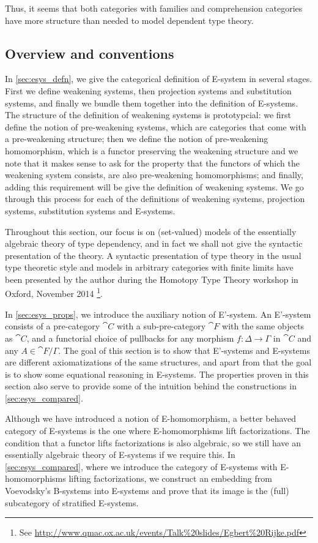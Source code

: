 \documentclass{article}
\begin{document}
Thus, it seems that both categories with families and comprehension categories
have more structure than needed to model dependent type theory.

\subsection*{Overview and conventions}
In \autoref{sec:esys_defn}, we give the categorical definition of E-system in 
several stages. First we define weakening systems, then projection systems and
substitution systems, and finally we bundle them together into the definition
of E-systems. The structure of the definition of weakening systems is 
prototypcial: we first define the notion of pre-weakening systems, which are
categories that come with a pre-weakening structure; then we define the notion
of pre-weakening homomorphism, which is a functor preserving the weakening
structure and we note that it makes sense to ask for the property that the
functors of which the weakening system consists, are also pre-weakening
homomorphisms; and finally, adding this requirement will be give the definition
of weakening systems. We go through this process for each of the definitions
of weakening systems, projection systems, substitution systems and E-systems.

Throughout this section, our focus is on (set-valued) models of the essentially algebraic
theory of type dependency, and in fact we shall not give the syntactic
presentation of the theory. A syntactic presentation of type theory in the
usual type theoretic style and models in arbitrary categories with finite limits
have been presented by the author during the Homotopy Type Theory workshop in
Oxford, November 2014%
\footnote{See \url{http://www.qmac.ox.ac.uk/events/Talk\%20slides/Egbert\%20Rijke.pdf}}.

In \autoref{sec:esys_props}, we introduce the auxiliary notion of E'-system.
An E'-system consists of a pre-category $\cat{C}$ with a sub-pre-category
$\cat{F}$ with the same objects as $\cat{C}$, and a functorial choice of
pullbacks for any morphism $f:\Delta\to\Gamma$ in $\cat{C}$ and any
$A\in\cat{F}/\Gamma$. The goal of this section is to show that 
E'-systems and E-systems are different axiomatizations of the same structures,
and apart from that the goal is to show some equational reasoning in E-systems.
The properties proven in this section also serve to provide some of the 
intuition behind the constructions in \autoref{sec:esys_compared}.

Although we have introduced a notion of E-homomorphism, a better behaved category
of E-systems is the one where E-homomorphisms lift factorizations. The condition
that a functor lifts factorizations is also algebraic, so we still have an
essentially algebraic theory of E-systems if we require this.
In \autoref{sec:esys_compared}, where we introduce the category of E-systems
with E-homomorphisms lifting factorizations, we construct an embedding from Voevodsky's
B-systems into E-systems and prove that its image is the (full) subcategory
of stratified E-systems. 
\end{document}

